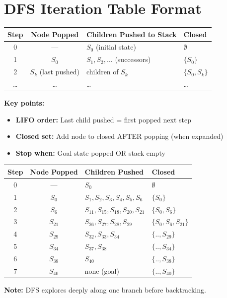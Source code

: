 \documentclass[11pt,a4paper]{article}
\begin{document}
\section{DFS Iteration Table Format}

\begin{definitionbox}
\begin{center}
\begin{tabular}{|c|c|l|l|}
\hline
\textbf{Step} & \textbf{Node Popped} & \textbf{Children Pushed to Stack} & \textbf{Closed} \\
\hline
0 & --- & $S_0$ (initial state) & $\emptyset$ \\
1 & $S_0$ & $S_1, S_2, \ldots$ (successors) & $\{S_0\}$ \\
2 & $S_k$ (last pushed) & children of $S_k$ & $\{S_0, S_k\}$ \\
\ldots & \ldots & \ldots & \ldots \\
\hline
\end{tabular}
\end{center}

\textbf{Key points:}
\begin{itemize}[leftmargin=*,nosep]
\item \textbf{LIFO order:} Last child pushed = first popped next step
\item \textbf{Closed set:} Add node to closed AFTER popping (when expanded)
\item \textbf{Stop when:} Goal state popped OR stack empty
\end{itemize}
\end{definitionbox}

\begin{examplebox}
\begin{center}
\begin{tabular}{|c|c|l|l|}
\hline
\textbf{Step} & \textbf{Node Popped} & \textbf{Children Pushed} & \textbf{Closed} \\
\hline
0 & --- & $S_0$ & $\emptyset$ \\
1 & $S_0$ & $S_1, S_2, S_3, S_4, S_5, S_6$ & $\{S_0\}$ \\
2 & $S_6$ & $S_{11}, S_{15}, S_{18}, S_{20}, S_{21}$ & $\{S_0, S_6\}$ \\
3 & $S_{21}$ & $S_{26}, S_{27}, S_{28}, S_{29}$ & $\{S_0, S_6, S_{21}\}$ \\
4 & $S_{29}$ & $S_{32}, S_{33}, S_{34}$ & $\{.., S_{29}\}$ \\
5 & $S_{34}$ & $S_{37}, S_{38}$ & $\{.., S_{34}\}$ \\
6 & $S_{38}$ & $S_{40}$ & $\{.., S_{38}\}$ \\
7 & $S_{40}$ & none (goal) & $\{.., S_{40}\}$ \\
\hline
\end{tabular}
\end{center}
\textbf{Note:} DFS explores deeply along one branch before backtracking.
\end{examplebox}
\end{document}
